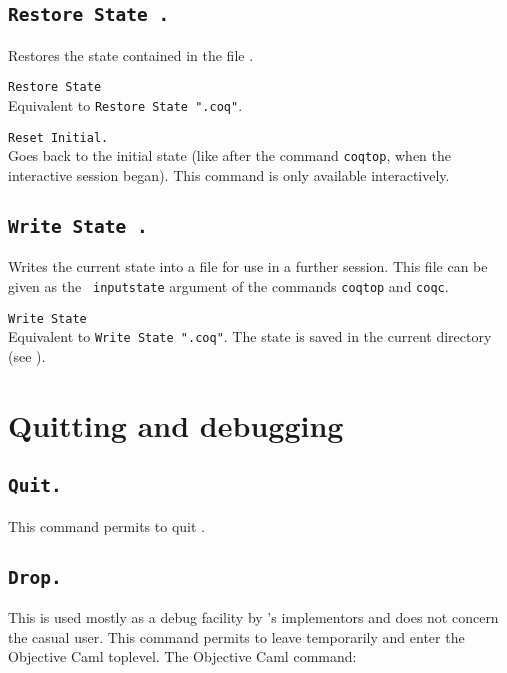 \subsection{\tt Restore State \str.}
  Restores the state contained in the file \str.

\begin{Variants}
\item {\tt Restore State \ident}\\
 Equivalent to {\tt Restore State "}{\ident}{\tt .coq"}.
\item {\tt Reset Initial.}\\ 
  Goes back to the initial state (like after the command {\tt coqtop},
  when the interactive session began). This command is only available
  interactively.
\end{Variants}

\subsection{\tt Write State \str.}
Writes the current state into a file \str{} for
use in a further session. This file can be given as the {\tt
  inputstate} argument of the commands {\tt coqtop} and {\tt coqc}.

\begin{Variants}
\item {\tt Write State \ident}\\
 Equivalent to {\tt Write State "}{\ident}{\tt .coq"}.
 The state is saved in the current directory (see \pageref{Pwd}).
\end{Variants}

\section{Quitting and debugging}

\subsection{\tt Quit.}
This command permits to quit \Coq.

\subsection{\tt Drop.}\label{Drop}

This is used mostly as a debug facility by \Coq's implementors
and does not concern the casual user.
This command permits to leave {\Coq} temporarily and enter the
Objective Caml toplevel. The Objective Caml command:

